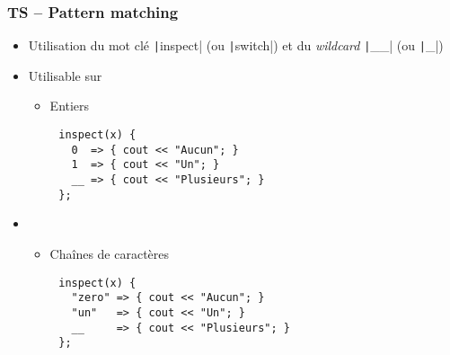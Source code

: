 \documentclass[C++.tex]{subfiles}
\begin{document}
\begin{frame}[fragile]
	\frametitle{TS -- Pattern matching}
	\begin{itemize}
		\item Utilisation du mot clé \texttt|inspect| (ou \texttt|switch|) et du \textit{wildcard} \texttt|__| (ou \texttt|_|)
		\item Utilisable sur
		\begin{itemize}
			\item Entiers
		\end{itemize}
	\end{itemize}

	\begin{verbatim}
		inspect(x) {
		  0  => { cout << "Aucun"; }
		  1  => { cout << "Un"; }
		  __ => { cout << "Plusieurs"; }
		};
	\end{verbatim}

	\begin{itemize}
		\item[]
		\begin{itemize}
			\item Chaînes de caractères
		\end{itemize}
	\end{itemize}

	\begin{verbatim}
		inspect(x) {
		  "zero" => { cout << "Aucun"; }
		  "un"   => { cout << "Un"; }
		  __     => { cout << "Plusieurs"; }
		};
	\end{verbatim}

	\begin{codesample}
		\sample{https://godbolt.org/#g:!((g:!((g:!((h:codeEditor,i:(filename:'1',fontScale:14,fontUsePx:'0',j:1,lang:c%

}
\end{codesample}
\end{frame}
\end{document}
